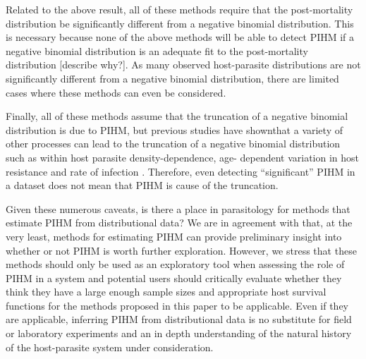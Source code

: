 \documentclass[12pt, a4paper]{article}
\begin{document}
Related to the above result, all of these methods require that the post-mortality distribution be significantly different from a negative binomial distribution.  This is necessary because none of the above methods will be able to detect PIHM if a negative binomial distribution is an adequate fit to the post-mortality distribution [describe why?].  As many observed host-parasite distributions are not significantly different from a negative binomial distribution, there are limited cases where these methods can even be considered.

Finally, all of these methods assume that the truncation of a negative binomial
distribution is due to PIHM, but previous studies have shownthat a variety of other processes can lead to the truncation of a negative
binomial distribution such as within host parasite density-dependence, age-
dependent variation in host resistance and rate of infection
\citep{McCallum2000a,Anderson1982a,Rousset1996}.  Therefore, even detecting ``significant'' PIHM in a
dataset does not mean that PIHM is cause of the truncation.

Given these numerous caveats, is there a place in parasitology for methods that
estimate PIHM from distributional data?  We are in agreement with
\cite{Lester1984} that, at the very least, methods for estimating PIHM can provide preliminary insight into whether or not PIHM is worth further exploration.  However, we stress that these methods should only be used as an
exploratory tool when assessing the role of PIHM in a system and potential
users should critically evaluate whether they think they have a large enough
sample sizes and appropriate host survival functions for the methods proposed
in this paper to be applicable.  Even if they are applicable, inferring PIHM
from distributional data is no substitute for field or laboratory experiments and an in
depth understanding of the natural history of the host-parasite system under consideration.


\singlespacing


\end{document}
